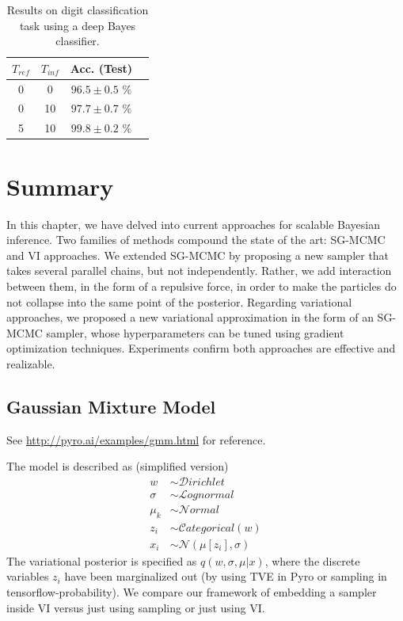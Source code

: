 \begin{table}[H]
\centering

\caption{Results on  digit classification task using a deep Bayes classifier.}\label{tab1}

\begin{tabular}{c@{\hskip 1.4in}c@{\hskip 1.3in}c@{\hskip 1.4in}c}
\toprule
${T_{ref}}$ &  ${T_{inf}}$ & \textbf{Acc. (Test)} \\
\midrule
0 & 0  & $96.5 \pm 0.5$ \% \\ 
0 & 10 &  $97.7 \pm 0.7$ \%\\
5 & 10 & $ {99.8 \pm 0.2}$ \% \\
\bottomrule
\end{tabular}
\end{table}

\section{Summary}

In this chapter, we have delved into current approaches for scalable Bayesian inference. Two families of methods compound the state of the art: SG-MCMC and VI approaches. We extended SG-MCMC by proposing a new sampler that takes several parallel chains, but not independently. Rather, we add interaction between them, in the form of a repulsive force, in order to make the particles do not collapse into the same point of the posterior. Regarding variational approaches, we proposed a new variational approximation in the form of an SG-MCMC sampler, whose hyperparameters can be tuned using gradient optimization techniques. Experiments confirm both approaches are effective and realizable.

\iffalse
\subsection{Gaussian Mixture Model}

See \url{http://pyro.ai/examples/gmm.html} for reference.

The model is described as (simplified version)
\begin{align*}
    w &\sim \mathcal{D}irichlet \\
    \sigma &\sim \mathcal{L}ognormal \\
    \mu_k &\sim \mathcal{N}ormal \\
    z_i &\sim \mathcal{C}ategorical(w)  \\
    x_i &\sim \mathcal{N}(\mu\left[z_i\right], \sigma) 
\end{align*}
The variational posterior is specified as $q(w, \sigma, \mu | {x})$, where the discrete variables $z_i$ have been marginalized out (by using TVE in Pyro or sampling in tensorflow-probability). We compare our framework of embedding a sampler inside VI versus just using sampling or just using VI.

